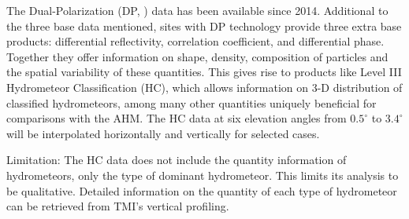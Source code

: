 The Dual-Polarization (DP, \cite{thompson2014dual}) data has been available since 2014. Additional to the three base data mentioned, sites with DP technology provide three extra base products: differential reflectivity, correlation coefficient, and differential phase. Together they offer information on shape, density, composition of particles and the spatial variability of these quantities. This gives rise to products like Level III Hydrometeor Classification (HC), which allows information on 3-D distribution of classified hydrometeors, among many other quantities uniquely beneficial for comparisons with the AHM. The HC data at six elevation angles from $0.5^{\circ}$ to $3.4^{\circ}$ will be interpolated horizontally and vertically for selected cases. 

Limitation: The HC data does not include the quantity information of hydrometeors, only the type of dominant hydrometeor. This limits its analysis to be qualitative. Detailed information on the quantity of each type of hydrometeor can be retrieved from TMI's vertical profiling.
